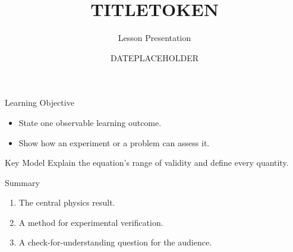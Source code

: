 \documentclass[aspectratio=169,12pt]{beamer}
\title[TITLETOKEN]{TITLETOKEN}
\subtitle{Lesson Presentation}
\author{}
\institute{Institution Name}
\date{DATEPLACEHOLDER}
\begin{document}
\begin{frame}[plain]
  \titlepage
\end{frame}

\begin{frame}{Learning Objective}
  \begin{itemize}
    \item State one observable learning outcome.
    \item Show how an experiment or a problem can assess it.
  \end{itemize}
\end{frame}

\begin{frame}{Key Model}
  \vspace{1em}
  Explain the equation's range of validity and define every quantity.
\end{frame}

\begin{frame}{Summary}
  \begin{enumerate}
    \item The central physics result.
    \item A method for experimental verification.
    \item A check-for-understanding question for the audience.
  \end{enumerate}
\end{frame}
\end{document}

